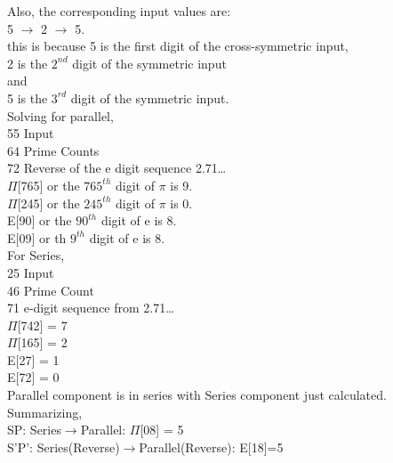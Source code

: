 Also, the corresponding input values are: \\

5 $\rightarrow$ 2 $\rightarrow$ 5.\\

this is because 5 is the first digit of the cross-symmetric input, \\
2 is the $2^{nd}$ digit of the symmetric input\\
and \\
5 is the $3^{rd}$ digit of the symmetric input.\\

Solving for parallel,\\

55 {Input}\\
64 {Prime Counts}\\
72  {Reverse of the e digit sequence 2.71\ldots}\\

$\Pi$[765] or the $765^{th}$ digit of $\pi$ is 9.\\
$\Pi$[245] or the $245^{th}$ digit of $\pi$ is 0.\\

E[90] or the $90^{th}$ digit of e is 8.\\
E[09] or th $9^{th}$ digit of e is 8.\\

For Series,\\
25 {Input}\\
46 {Prime Count}\\
71 {e-digit sequence from 2.71\ldots}\\

$\Pi$[742] = 7\\
$\Pi$[165] = 2\\
E[27] = 1\\
E[72] = 0\\

Parallel component is in series with Series component just calculated.\\

Summarizing,\\

SP: Series$\rightarrow$Parallel: $\Pi$[08] = 5\\
S'P': Series(Reverse)$\rightarrow$Parallel(Reverse): E[18]=5 \\

